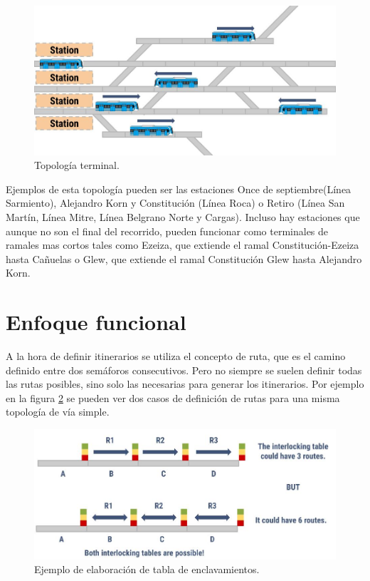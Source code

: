 			\begin{figure}[h]
			\centering
				\includegraphics[scale=.4]{./Figures/Terminal}
				\caption{Topología terminal.}
				\label{fig:Terminal}
			\end{figure}
		
		Ejemplos de esta topología pueden ser las estaciones Once de septiembre(Línea Sarmiento), Alejandro Korn y Constitución (Línea Roca) o Retiro (Línea San Martín, Línea Mitre, Línea Belgrano Norte y Cargas). Incluso hay estaciones que aunque no son el final del recorrido, pueden funcionar como terminales de ramales mas cortos tales como Ezeiza, que extiende el ramal Constitución-Ezeiza hasta Cañuelas o Glew, que extiende el ramal Constitución Glew hasta Alejandro Korn.
							
\section{Enfoque funcional}
	\label{Incompletitud}
	
	A la hora de definir itinerarios se utiliza el concepto de ruta, que es el camino definido entre dos semáforos consecutivos. Pero no siempre se suelen definir todas las rutas posibles, sino solo las necesarias para generar los itinerarios. Por ejemplo en la figura \ref{fig:EJ_Tabla} se pueden ver dos casos de definición de rutas para una misma topología de vía simple.
	
	\begin{figure}[h]
		\centering
			\includegraphics[scale=.4]{./Figures/Tablas}
			\caption{Ejemplo de elaboración de tabla de enclavamientos.}
			\label{fig:EJ_Tabla}
		\end{figure}
	
